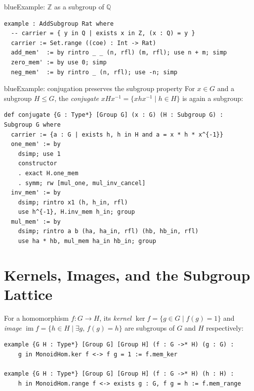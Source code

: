 \documentclass[11pt]{article}
\begin{document}
\begin{defbox}{blue}{Example: \texorpdfstring{$\mathbb{Z}$}{Z} as a subgroup of \texorpdfstring{$\mathbb{Q}$}{Q}}
\begin{lstlisting}
example : AddSubgroup Rat where
  -- carrier = { y in Q | exists x in Z, (x : Q) = y }
  carrier := Set.range ((coe) : Int -> Rat)
  add_mem'  := by rintro _ _ (n, rfl) (m, rfl); use n + m; simp
  zero_mem' := by use 0; simp
  neg_mem'  := by rintro _ (n, rfl); use -n; simp
\end{lstlisting}
\end{defbox}

\begin{defbox}{blue}{Example: conjugation preserves the subgroup property}
For $x\in G$ and a subgroup $H\le G$, the \emph{conjugate} $xHx^{-1}=\{xhx^{-1}\mid h\in H\}$ is again a subgroup:
\begin{lstlisting}
def conjugate {G : Type*} [Group G] (x : G) (H : Subgroup G) : Subgroup G where
  carrier := {a : G | exists h, h in H and a = x * h * x^{-1}}
  one_mem' := by
    dsimp; use 1
    constructor
    . exact H.one_mem
    . symm; rw [mul_one, mul_inv_cancel]
  inv_mem' := by
    dsimp; rintro x1 (h, h_in, rfl)
    use h^{-1}, H.inv_mem h_in; group
  mul_mem' := by
    dsimp; rintro a b (ha, ha_in, rfl) (hb, hb_in, rfl)
    use ha * hb, mul_mem ha_in hb_in; group
\end{lstlisting}
\end{defbox}

\section{Kernels, Images, and the Subgroup Lattice}

For a homomorphism $f:G\to H$, its \emph{kernel} $\ker f=\{g\in G\mid f(g)=1\}$ and \emph{image} $\operatorname{im}f=\{h\in H\mid \exists g,\,f(g)=h\}$ are subgroups of $G$ and $H$ respectively:

\begin{lstlisting}
example {G H : Type*} [Group G] [Group H] (f : G ->* H) (g : G) :
    g in MonoidHom.ker f <-> f g = 1 := f.mem_ker

example {G H : Type*} [Group G] [Group H] (f : G ->* H) (h : H) :
    h in MonoidHom.range f <-> exists g : G, f g = h := f.mem_range
\end{lstlisting}
\end{document}
